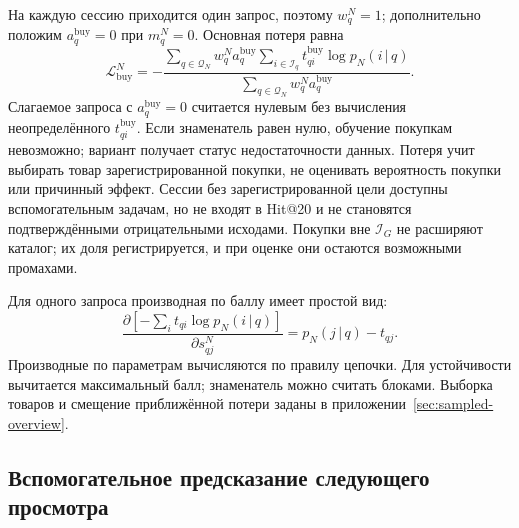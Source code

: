 \documentclass[12pt,a4paper]{article}
\newcommand{\given}{\,\vert\,}
\theoremstyle{plainru}
\begin{document}
На каждую сессию приходится один запрос, поэтому $w_q^N=1$;
дополнительно положим $a_q^{\mathrm{buy}}=0$ при $m_q^N=0$.
Основная потеря равна
\begin{equation}\label{eq:modern-buy-loss}
\mathcal L_{\mathrm{buy}}^N=
-\frac{\displaystyle\sum_{q\in\mathcal Q_N}w_q^Na_q^{\mathrm{buy}}
\sum_{i\in\mathcal I_q}t_{qi}^{\mathrm{buy}}\log p_N(i\given q)}
{\displaystyle\sum_{q\in\mathcal Q_N}w_q^Na_q^{\mathrm{buy}}}.
\end{equation}
Слагаемое запроса с $a_q^{\mathrm{buy}}=0$ считается нулевым без
вычисления неопределённого $t_{qi}^{\mathrm{buy}}$.
Если знаменатель равен нулю, обучение покупкам невозможно;
вариант получает статус недостаточности данных.
Потеря учит выбирать товар зарегистрированной покупки, не оценивать
вероятность покупки или причинный эффект. Сессии без зарегистрированной
цели доступны вспомогательным задачам, но не входят в Hit@20 и не становятся
подтверждёнными отрицательными исходами.
Покупки вне $\mathcal I_G$ не расширяют каталог; их доля регистрируется,
и при оценке они остаются возможными промахами.

Для одного запроса производная по баллу имеет простой вид:
\begin{equation}\label{eq:modern-softmax-gradient}
\frac{\partial\left[-\sum_i t_{qi}\log p_N(i\given q)\right]}
{\partial s_{qj}^{N}}=p_N(j\given q)-t_{qj}.
\end{equation}
Производные по параметрам вычисляются по правилу цепочки.
Для устойчивости вычитается максимальный балл; знаменатель можно
считать блоками. Выборка товаров и смещение приближённой потери
заданы в приложении~\ref{sec:sampled-overview}.

\subsection{Вспомогательное предсказание следующего просмотра}
\label{sec:modern-next}
\end{document}
